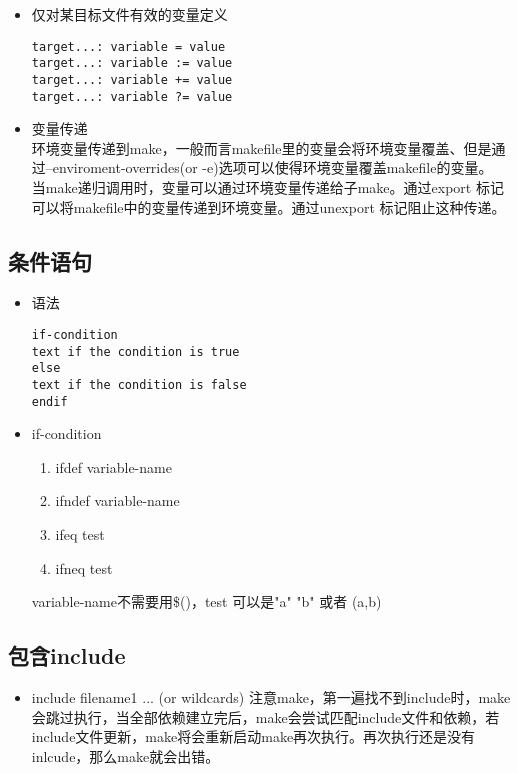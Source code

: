 \begin{itemize}
	 	\item 仅对某目标文件有效的变量定义\\
\begin{lstlisting}[numbers = none]
target...: variable = value
target...: variable := value
target...: variable += value
target...: variable ?= value
\end{lstlisting}	 	
		\item 变量传递\\
		环境变量传递到make，一般而言makefile里的变量会将环境变量覆盖、但是通过--enviroment-overrides(or -e)选项可以使得环境变量覆盖makefile的变量。\\
		当make递归调用时，变量可以通过环境变量传递给子make。通过export 标记可以将makefile中的变量传递到环境变量。通过unexport 标记阻止这种传递。
	\end{itemize}
\subsection{条件语句}
\begin{itemize}
	\item 语法\\
\begin{lstlisting}
if-condition
text if the condition is true
else
text if the condition is false
endif
\end{lstlisting}	
	\item  	if-condition\\
	\begin{enumerate}
		\item ifdef variable-name
		\item ifndef variable-name
		\item ifeq test
		\item ifneq test
	\end{enumerate}
	variable-name不需要用\$()，test 可以是"a" "b" 或者 (a,b)
\end{itemize}
\subsection{包含include}
\begin{itemize}
	\item include filename1 ... (or wildcards)
	注意make，第一遍找不到include时，make会跳过执行，当全部依赖建立完后，make会尝试匹配include文件和依赖，若include文件更新，make将会重新启动make再次执行。再次执行还是没有inlcude，那么make就会出错。
\end{itemize}
